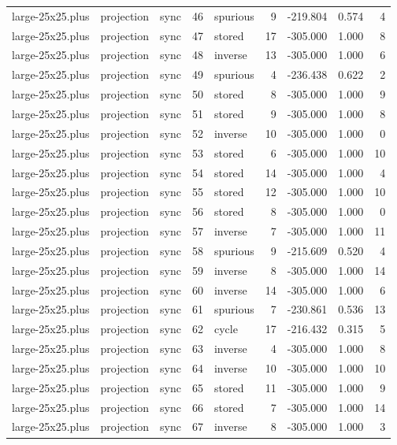 \begin{tabular}{lllrlrrrr}
large-25x25.plus & projection & sync & 46 & spurious & 9 & -219.804 & 0.574 & 4 \\
large-25x25.plus & projection & sync & 47 & stored & 17 & -305.000 & 1.000 & 8 \\
large-25x25.plus & projection & sync & 48 & inverse & 13 & -305.000 & 1.000 & 6 \\
large-25x25.plus & projection & sync & 49 & spurious & 4 & -236.438 & 0.622 & 2 \\
large-25x25.plus & projection & sync & 50 & stored & 8 & -305.000 & 1.000 & 9 \\
large-25x25.plus & projection & sync & 51 & stored & 9 & -305.000 & 1.000 & 8 \\
large-25x25.plus & projection & sync & 52 & inverse & 10 & -305.000 & 1.000 & 0 \\
large-25x25.plus & projection & sync & 53 & stored & 6 & -305.000 & 1.000 & 10 \\
large-25x25.plus & projection & sync & 54 & stored & 14 & -305.000 & 1.000 & 4 \\
large-25x25.plus & projection & sync & 55 & stored & 12 & -305.000 & 1.000 & 10 \\
large-25x25.plus & projection & sync & 56 & stored & 8 & -305.000 & 1.000 & 0 \\
large-25x25.plus & projection & sync & 57 & inverse & 7 & -305.000 & 1.000 & 11 \\
large-25x25.plus & projection & sync & 58 & spurious & 9 & -215.609 & 0.520 & 4 \\
large-25x25.plus & projection & sync & 59 & inverse & 8 & -305.000 & 1.000 & 14 \\
large-25x25.plus & projection & sync & 60 & inverse & 14 & -305.000 & 1.000 & 6 \\
large-25x25.plus & projection & sync & 61 & spurious & 7 & -230.861 & 0.536 & 13 \\
large-25x25.plus & projection & sync & 62 & cycle & 17 & -216.432 & 0.315 & 5 \\
large-25x25.plus & projection & sync & 63 & inverse & 4 & -305.000 & 1.000 & 8 \\
large-25x25.plus & projection & sync & 64 & inverse & 10 & -305.000 & 1.000 & 10 \\
large-25x25.plus & projection & sync & 65 & stored & 11 & -305.000 & 1.000 & 9 \\
large-25x25.plus & projection & sync & 66 & stored & 7 & -305.000 & 1.000 & 14 \\
large-25x25.plus & projection & sync & 67 & inverse & 8 & -305.000 & 1.000 & 3 \\

\end{tabular}
